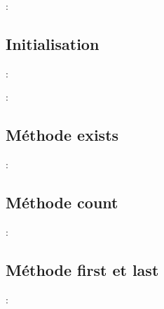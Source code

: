 \documentclass[10pt]{beamer}
\begin{document}
\begin{frame}{\secname : \subsecname}
    
\end{frame}

\subsection{Initialisation}
\begin{frame}{\secname : \subsecname}
    
\end{frame}

\begin{frame}{\secname : \subsecname}
    
\end{frame}

\subsection{Méthode exists}
\begin{frame}{\secname : \subsecname}
    
\end{frame}

\subsection{Méthode count}
\begin{frame}{\secname : \subsecname}
    
\end{frame}

\subsection{Méthode first et last}
\begin{frame}{\secname : \subsecname}
    
\end{frame}
\end{document}

